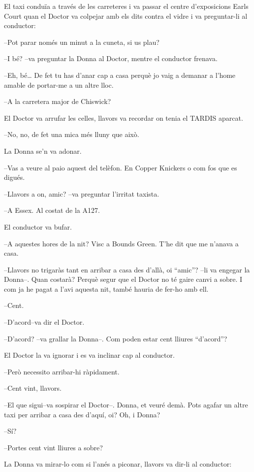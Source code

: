 El taxi conduïa a través de les carreteres i va passar el centre
d'exposicions Earls Court quan el Doctor va colpejar amb els dits contra
el vidre i va preguntar-li al conductor:

--Pot parar només un minut a la cuneta, si us plau?

--I bé? --va preguntar la Donna al Doctor, mentre el conductor frenava.

--Eh, bé\ldots{} De fet tu has d'anar cap a casa perquè jo vaig a
demanar a l'home amable de portar-me a un altre lloc.

--A la carretera major de Chiswick?

El Doctor va arrufar les celles, llavors va recordar on tenia el TARDIS
aparcat.

--No, no, de fet una mica més lluny que això.

La Donna se'n va adonar.

--Vas a veure al paio aquest del telèfon. En Copper Knickers o com fos
que es digués.

--Llavors a on, amic? --va preguntar l'irritat taxista.

--A Essex. Al costat de la A127.

El conductor va bufar.

--A aquestes hores de la nit? Visc a Bounds Green. T'he dit que me
n'anava a casa.

--Llavors no trigaràs tant en arribar a casa des d'allà, oi ``amic''?
--li va engegar la Donna--. Quan costarà? Perquè segur que el Doctor no
té gaire canvi a sobre. I com ja he pagat a l'avi aquesta nit, també
hauria de fer-ho amb ell.

--Cent.

--D'acord--va dir el Doctor.

--D'acord? --va grallar la Donna--. Com poden estar cent lliures
``d'acord''?

El Doctor la va ignorar i es va inclinar cap al conductor.

--Però necessito arribar-hi ràpidament.

--Cent vint, llavors.

--El que sigui--va sospirar el Doctor--. Donna, et veuré demà. Pots
agafar un altre taxi per arribar a casa des d'aquí, oi? Oh, i Donna?

--Sí?

--Portes cent vint lliures a sobre?

La Donna va mirar-lo com si l'anés a piconar, llavors va dir-li al
conductor:

